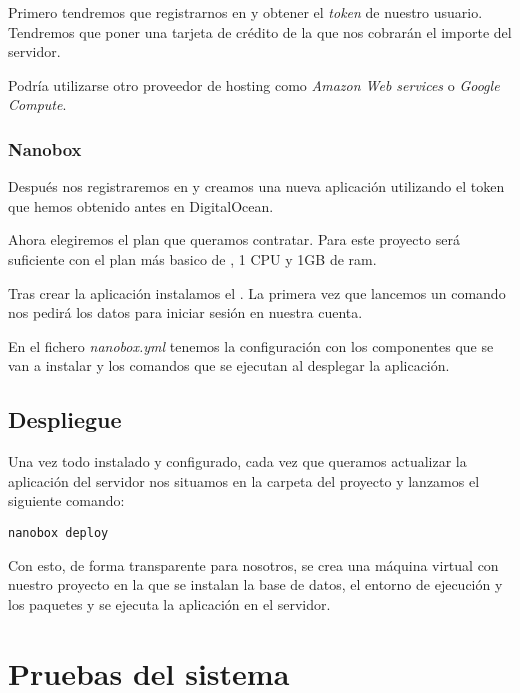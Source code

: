 Primero tendremos que registrarnos en  y obtener el \textit{token} de nuestro usuario. Tendremos que poner una tarjeta de crédito de la que nos cobrarán el importe del servidor.

Podría utilizarse otro proveedor de hosting como \textit{Amazon Web services} o \textit{Google Compute}.

\subsubsection{Nanobox}

Después nos registraremos en  y creamos una nueva aplicación utilizando el token que hemos obtenido antes en DigitalOcean.

Ahora elegiremos el plan que queramos contratar. Para este proyecto será suficiente con el plan más basico de , 1 CPU y 1GB de ram.

Tras crear la aplicación instalamos el . La primera vez que lancemos un comando nos pedirá los datos para iniciar sesión en nuestra cuenta.

En el fichero \textit{nanobox.yml} tenemos la configuración con los componentes que se van a instalar y los comandos que se ejecutan al desplegar la aplicación.

\subsection{Despliegue}


Una vez todo instalado y configurado, cada vez que queramos actualizar la aplicación del servidor nos situamos en la carpeta del proyecto y lanzamos el siguiente comando:

\begin{lstlisting}
nanobox deploy
\end{lstlisting}

Con esto, de forma transparente para nosotros, se crea una máquina virtual con nuestro proyecto en la que se instalan la base de datos, el entorno de ejecución y los paquetes y se ejecuta la aplicación en el servidor.

\section{Pruebas del sistema}
